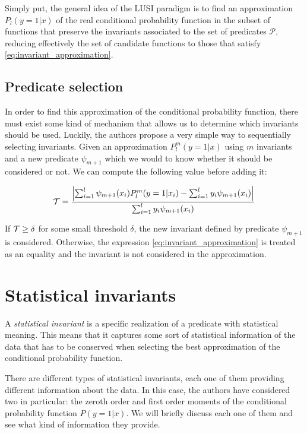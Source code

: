 Simply put, the general idea of the LUSI paradigm is to find an approximation $P_l(y=1|x)$ of the
real conditional probability function in the subset of functions that preserve the invariants
associated to the set of predicates $\mathcal{P}$, reducing effectively the set of candidate functions
to those that satisfy \eqref{eq:invariant_approximation}.

\subsection{Predicate selection}

In order to find this approximation of the conditional probability function, there must exist
some kind of mechanism that allows us to determine which invariants should be used. Luckily,
the authors propose a very simple way to sequentially selecting invariants. Given an approximation
$P_l^m(y=1|x)$ using $m$ invariants and a new predicate $\psi_{m+1}$ which we would to know whether
it should be considered or not. We can compute the following value before adding it:

\begin{equation}
    \label{eq:predicate_selection}
    \mathcal{T} = \frac{\left| \sum_{i=1}^l \psi_{m+1}(x_i) P^m_l(y = 1 | x_i) - \sum_{i=1}^l y_i \psi_{m+1}(x_i) \right|}{\sum_{i=1}^l y_i \psi_{m+1}(x_i)}
\end{equation}

If $\mathcal{T} \geq \delta$ for some small threshold $\delta$, the new invariant defined by predicate $\psi_{m+1}$
is considered. Otherwise, the expression \eqref{eq:invariant_approximation} is treated as an equality
and the invariant is not considered in the approximation.


\section{Statistical invariants}

A \emph{statistical invariant} is a specific realization of a predicate with statistical meaning.
This means that it captures some sort of statistical information of the data that has to be
conserved when selecting the best approximation of the conditional probability function.

There are different types of statistical invariants, each one of them
providing different information about the data. In this case, the authors have considered
two in particular: the zeroth order and first order moments of the conditional probability
function $P(y=1|x)$. We will briefly discuss each one of them and see what kind of information
they provide.

